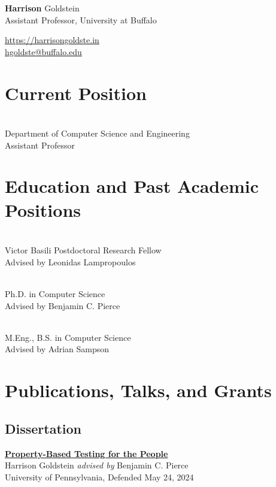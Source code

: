 \documentclass[a4paper]{article}
\newcommand{\semibf}{\fontseries{semibold}\selectfont}
\begin{document}
\noindent
{\selectfont
\begin{minipage}[t]{.5\textwidth}
  \vspace{0pt}
  {\Huge {\textbf{Harrison}} Goldstein} \\
  {\Large Assistant Professor, University at Buffalo}
\end{minipage}
\begin{minipage}[t]{.5\textwidth}
  \vspace{0pt}
  \flushright
  {\large \href{https://harrisongoldste.in}{https://harrisongoldste.in}} \\
  {\large \href{mailto:hgoldste@buffalo.edu}{hgoldste@buffalo.edu}} \\
\end{minipage}}


\section*{Current Position}
 \\
Department of Computer Science and Engineering \\
Assistant Professor

\section*{Education and Past Academic Positions}
 \\
Victor Basili Postdoctoral Research Fellow \\
Advised by Leonidas Lampropoulos

\bigskip
{} \\
Ph.D. in Computer Science \\
Advised by Benjamin C. Pierce

\bigskip
{} \\
M.Eng., B.S. in Computer Science \\
Advised by Adrian Sampson


\noindent 

\section*{Publications, Talks, and Grants}
\subsection*{Dissertation}
\href{https://repository.upenn.edu/entities/publication/72ca3499-c5f6-4fc1-b5a3-9d66d8dd534e}{\bf Property-Based Testing for the People} \\
{\semibf Harrison Goldstein} {\em advised by} Benjamin C. Pierce \\
University of Pennsylvania, Defended May 24, 2024
\end{document}
